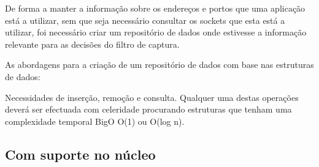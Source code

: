 De forma a manter a informação sobre os endereços e portos que uma aplicação está a utilizar, sem que seja necessário consultar os sockets que esta está a utilizar, foi necessário criar um repositório de dados onde estivesse a informação relevante para as decisões do filtro de captura.

As abordagens para a criação de um repositório de dados com base nas estruturas de dados:

Necessidades de inserção, remoção e consulta. Qualquer uma destas operações deverá ser efectuada com celeridade procurando estruturas que tenham uma complexidade temporal BigO O(1) ou O(log n).

\subsection{Com suporte no núcleo}

